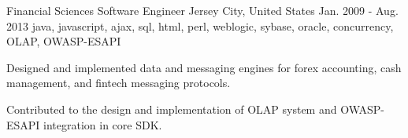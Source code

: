 \cventry
    {Financial Sciences} %
    {Software Engineer} %
    {Jersey City, United States} %
    {Jan. 2009 - Aug. 2013} %
    {java, javascript, ajax, sql, html, perl, weblogic, sybase, oracle, concurrency, OLAP, OWASP-ESAPI} %
    {
    \begin{cvitems} %
        \item {Designed and implemented data and messaging engines for forex accounting, cash management, and fintech messaging protocols.}
        \item {Contributed to the design and implementation of OLAP system and OWASP-ESAPI integration in core SDK.}
    \end{cvitems}
    }
